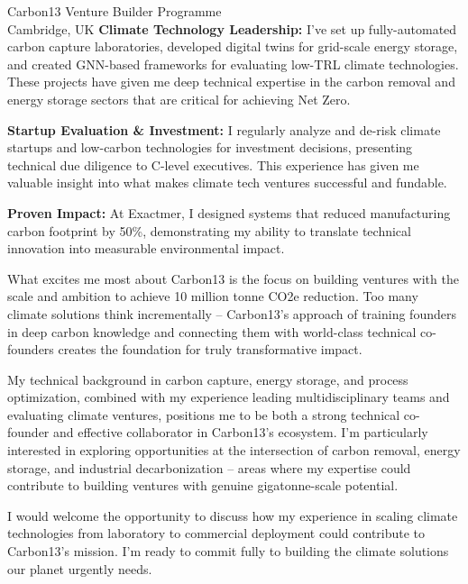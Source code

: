 \documentclass[12pt]{letter} %
\begin{document}
\begin{letter}{
	Carbon13 Venture Builder Programme \\
	Cambridge, UK
}
\textbf{Climate Technology Leadership:} I've set up fully-automated carbon capture laboratories, developed digital twins for grid-scale energy storage, and created GNN-based frameworks for evaluating low-TRL climate technologies. These projects have given me deep technical expertise in the carbon removal and energy storage sectors that are critical for achieving Net Zero.

\textbf{Startup Evaluation \& Investment:} I regularly analyze and de-risk climate startups and low-carbon technologies for investment decisions, presenting technical due diligence to C-level executives. This experience has given me valuable insight into what makes climate tech ventures successful and fundable.

\textbf{Proven Impact:} At Exactmer, I designed systems that reduced manufacturing carbon footprint by 50\%, demonstrating my ability to translate technical innovation into measurable environmental impact.

What excites me most about Carbon13 is the focus on building ventures with the scale and ambition to achieve 10 million tonne CO2e reduction. Too many climate solutions think incrementally – Carbon13's approach of training founders in deep carbon knowledge and connecting them with world-class technical co-founders creates the foundation for truly transformative impact.

My technical background in carbon capture, energy storage, and process optimization, combined with my experience leading multidisciplinary teams and evaluating climate ventures, positions me to be both a strong technical co-founder and effective collaborator in Carbon13's ecosystem. I'm particularly interested in exploring opportunities at the intersection of carbon removal, energy storage, and industrial decarbonization – areas where my expertise could contribute to building ventures with genuine gigatonne-scale potential.

\closing{I would welcome the opportunity to discuss how my experience in scaling climate technologies from laboratory to commercial deployment could contribute to Carbon13's mission. I'm ready to commit fully to building the climate solutions our planet urgently needs.}


\end{letter}
\end{document}

